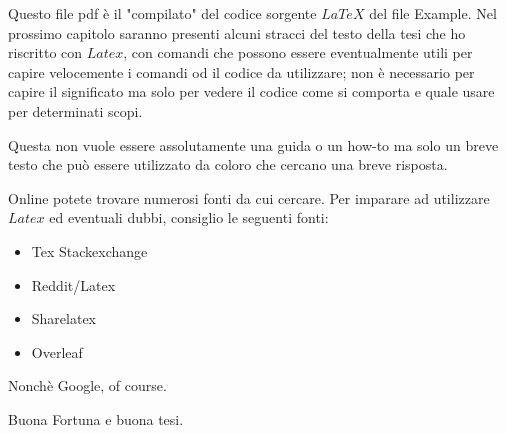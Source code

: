 Questo file pdf è il "compilato" del codice sorgente $LaTeX$ del file Example. Nel prossimo capitolo saranno presenti alcuni stracci del testo della tesi che ho riscritto con $Latex$, con comandi che possono essere eventualmente utili per capire velocemente i comandi od il codice da utilizzare; non è necessario per capire il significato ma solo per vedere il codice come si comporta e quale usare per determinati scopi.

Questa non vuole essere assolutamente una guida o un how-to ma solo un breve testo che può essere utilizzato da coloro che cercano una breve risposta.

Online potete trovare numerosi fonti da cui cercare. Per imparare ad utilizzare $Latex$ ed eventuali dubbi, consiglio le seguenti fonti:

\begin{itemize}
\item Tex Stackexchange
\item Reddit/Latex
\item Sharelatex
\item Overleaf
\end{itemize}

Nonchè Google, of course.

Buona Fortuna e buona tesi.